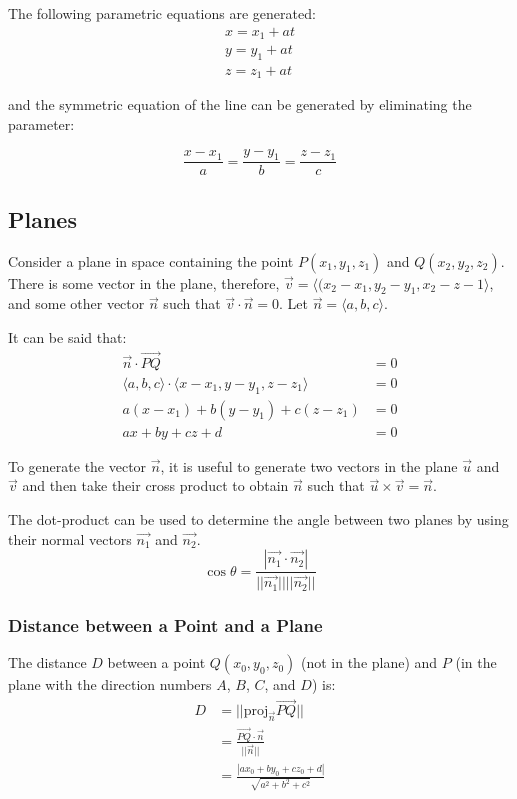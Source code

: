 The following parametric equations are generated:
\begin{align}
  x=x_1+at \\
  y=y_1+at \\
  z=z_1+at
\end{align}

and the symmetric equation of the line can be generated by eliminating the
parameter:

\begin{equation}
  \frac{x-x_1}{a} = \frac{y-y_1}{b} = \frac{z-z_1}{c}
\end{equation}

\subsection{Planes}
Consider a plane in space containing the point $P(x_1,y_1,z_1)$ and
$Q(x_2,y_2,z_2)$. There is some vector in the plane, therefore, $\vec{v}=\langle
(x_2-x_1,y_2-y_1,x_2-z-1 \rangle$, and some other vector $\vec{n}$ such that
$\vec{v}\cdot\vec{n}=0$. Let $\vec{n}=\langle a,b,c \rangle$.

It can be said that:
\begin{equation}
  \begin{aligned}
    \vec{n}\cdot\vec{PQ} &= 0\\
    \langle a,b,c \rangle \cdot \langle x-x_1, y-y_1, z-z_1 \rangle &= 0\\
    a(x-x_1)+b(y-y_1)+c(z-z_1) &= 0\\
    ax+by+cz+d &= 0
  \end{aligned}
\end{equation}

To generate the vector $\vec{n}$, it is useful to generate two vectors in the
plane $\vec{u}$ and $\vec{v}$ and then take their cross product to obtain
$\vec{n}$ such that $\vec{u}\times\vec{v}=\vec{n}$.

The dot-product can be used to determine the angle between two planes by using
their normal vectors $\vec{n_1}$ and $\vec{n_2}$.
\begin{equation}
  \cos\theta=\frac{|\vec{n_1}\cdot\vec{n_2}|}{||\vec{n_1}||||\vec{n_2}||}
\end{equation}

\subsubsection{Distance between a Point and a Plane}
The distance $D$ between a point $Q(x_0,y_0,z_0)$ (not in the plane) and $P$ (in
the plane with the direction numbers $A$, $B$, $C$, and $D$) is:
\begin{equation}
  \begin{aligned}
    D &= ||\text{proj}_{\vec{n}}\vec{PQ}|| \\
      &= \frac{\vec{PQ}\cdot\vec{n}}{||\vec{n}||} \\
      &= \frac{|ax_0+by_0+cz_0+d|}{\sqrt{a^2+b^2+c^2}}
  \end{aligned}
\end{equation}

